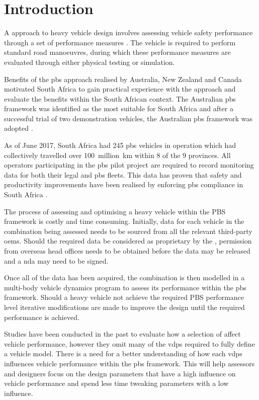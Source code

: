 \chapter{Introduction}\label{chapter:introduction}

A  approach to heavy vehicle design involves assessing vehicle safety performance through a set of performance measures \cite{Arredondo2012}. The vehicle is required to perform standard road manoeuvres, during which these performance measures are evaluated through either physical testing or simulation.

Benefits of the \gls{pbs} approach realised by Australia, New Zealand and Canada motivated South Africa to gain practical experience with the approach and evaluate the benefits within the South African context. The Australian \gls{pbs} framework was identified as the most suitable for South Africa and after a successful trial of two demonstration vehicles, the Australian \gls{pbs} framework was adopted \cite{Nordengen2014}. 

As of June 2017, South Africa had 245 \gls{pbs} vehicles in operation which had collectively travelled over 100~million~km within 8 of the 9 provinces. All operators participating in the \gls{pbs} pilot project are required to record monitoring data for both their legal and \gls{pbs} fleets. This data has proven that safety and productivity improvements have been realised by enforcing \gls{pbs} compliance in South Africa \cite{Nordengen2018}.

The process of assessing and optimising a heavy vehicle within the PBS framework is costly and time consuming. Initially, data for each vehicle in the combination being assessed needs to be sourced from all the relevant third-party \glspl{oem}. Should the required data be considered as proprietary by the , permission from overseas head offices needs to be obtained before the data may be released and a \gls{nda} may need to be signed. 

Once all of the data has been acquired, the combination is then modelled in a multi-body vehicle dynamics program to assess its performance within the \gls{pbs} framework. Should a heavy vehicle not achieve the required PBS performance level iterative modifications are made to improve the design until the required performance is achieved. 

Studies have been conducted in the past to evaluate how a selection of  affect vehicle performance, however they omit many of the \glspl{vdp} required to fully define a vehicle model. There is a need for a better understanding of how each \glspl{vdp} influences vehicle performance within the \gls{pbs} framework. This will help assessors and designers focus on the design parameters that have a high influence on vehicle performance and spend less time tweaking parameters with a low influence.

